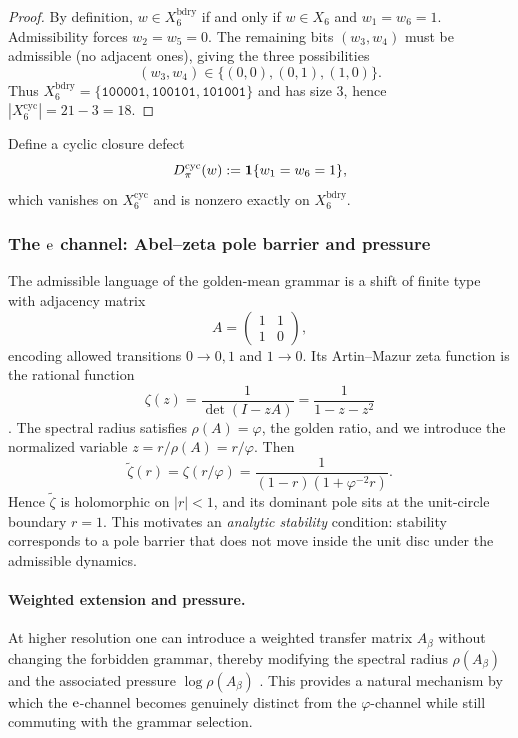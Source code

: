 \begin{proof}
By definition, $w\in X^{\mathrm{bdry}}_6$ if and only if $w\in X_6$ and $w_1=w_6=1$.
Admissibility forces $w_2=w_5=0$.
The remaining bits $(w_3,w_4)$ must be admissible (no adjacent ones), giving the three possibilities
\[
(w_3,w_4)\in\{(0,0),(0,1),(1,0)\}.
\]
Thus $X^{\mathrm{bdry}}_6=\{\texttt{100001},\texttt{100101},\texttt{101001}\}$ and has size $3$, hence $|X^{\mathrm{cyc}}_6|=21-3=18$.
\end{proof}

Define a cyclic closure defect
\[
D_\pi^{\mathrm{cyc}}(w):=\mathbf{1}\{w_1=w_6=1\},
\]
which vanishes on $X^{\mathrm{cyc}}_6$ and is nonzero exactly on $X^{\mathrm{bdry}}_6$.

\subsubsection{The \texorpdfstring{$\mathrm{e}$}{e} channel: Abel--zeta pole barrier and pressure}
\label{subsubsec:e_channel}

The admissible language of the golden-mean grammar is a shift of finite type with adjacency matrix
\[
A=\begin{pmatrix}
1 & 1\\
1 & 0
\end{pmatrix},
\]
encoding allowed transitions $0\to 0,1$ and $1\to 0$.
Its Artin--Mazur zeta function is the rational function
\[
\zeta(z)=\frac{1}{\det(I-zA)}=\frac{1}{1-z-z^2}
\]
\cite{ArtinMazur1965,ParryPollicott1990}.
The spectral radius satisfies $\rho(A)=\varphi$, the golden ratio, and we introduce the normalized variable $z=r/\rho(A)=r/\varphi$.
Then
\[
\tilde{\zeta}(r)=\zeta(r/\varphi)=\frac{1}{(1-r)\left(1+\varphi^{-2}r\right)}.
\]
Hence $\tilde{\zeta}$ is holomorphic on $|r|<1$, and its dominant pole sits at the unit-circle boundary $r=1$.
This motivates an \emph{analytic stability} condition: stability corresponds to a pole barrier that does not move inside the unit disc under the admissible dynamics.

\paragraph{Weighted extension and pressure.}
At higher resolution one can introduce a weighted transfer matrix $A_\beta$ without changing the forbidden grammar, thereby modifying the spectral radius $\rho(A_\beta)$ and the associated pressure $\log\rho(A_\beta)$ \cite{Ruelle1978}.
This provides a natural mechanism by which the $\mathrm{e}$-channel becomes genuinely distinct from the $\varphi$-channel while still commuting with the grammar selection.



